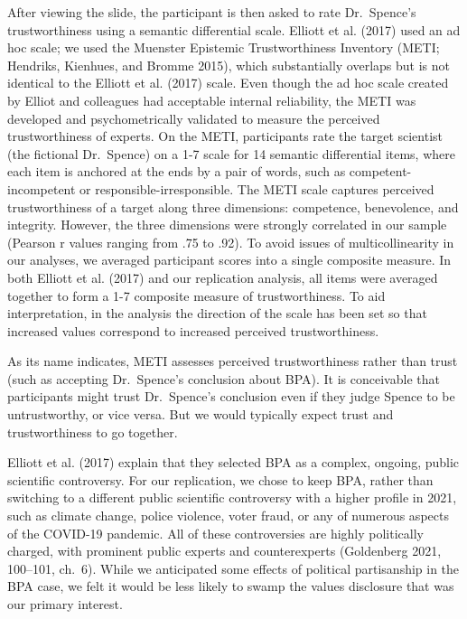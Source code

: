 \documentclass[
  letterpaper,
  DIV=11,
  numbers=noendperiod]{scrartcl}
\begin{document}
After viewing the slide, the participant is then asked to rate
Dr.~Spence's trustworthiness using a semantic differential scale.
Elliott et al. (2017) used an ad hoc scale; we used the Muenster
Epistemic Trustworthiness Inventory (METI; Hendriks, Kienhues, and
Bromme 2015), which substantially overlaps but is not identical to the
Elliott et al. (2017) scale. Even though the ad hoc scale created by
Elliot and colleagues had acceptable internal reliability, the METI was
developed and psychometrically validated to measure the perceived
trustworthiness of experts. On the METI, participants rate the target
scientist (the fictional Dr.~Spence) on a 1-7 scale for 14 semantic
differential items, where each item is anchored at the ends by a pair of
words, such as competent-incompetent or responsible-irresponsible. The
METI scale captures perceived trustworthiness of a target along three
dimensions: competence, benevolence, and integrity. However, the three
dimensions were strongly correlated in our sample (Pearson r values
ranging from .75 to .92). To avoid issues of multicollinearity in our
analyses, we averaged participant scores into a single composite
measure. In both Elliott et al. (2017) and our replication analysis, all
items were averaged together to form a 1-7 composite measure of
trustworthiness. To aid interpretation, in the analysis the direction of
the scale has been set so that increased values correspond to increased
perceived trustworthiness.

As its name indicates, METI assesses perceived trustworthiness rather
than trust (such as accepting Dr.~Spence's conclusion about BPA). It is
conceivable that participants might trust Dr.~Spence's conclusion even
if they judge Spence to be untrustworthy, or vice versa. But we would
typically expect trust and trustworthiness to go together.

Elliott et al. (2017) explain that they selected BPA as a complex,
ongoing, public scientific controversy. For our replication, we chose to
keep BPA, rather than switching to a different public scientific
controversy with a higher profile in 2021, such as climate change,
police violence, voter fraud, or any of numerous aspects of the COVID-19
pandemic. All of these controversies are highly politically charged,
with prominent public experts and counterexperts (Goldenberg 2021,
100--101, ch.~6). While we anticipated some effects of political
partisanship in the BPA case, we felt it would be less likely to swamp
the values disclosure that was our primary interest.
\end{document}
